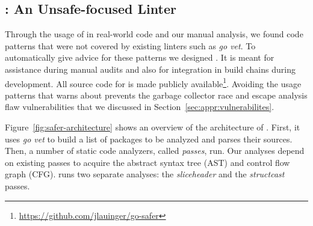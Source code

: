 \subsection{\toolSA{}: An Unsafe-focused Linter}

Through the usage of \toolUsage{} in real-world code and our manual analysis, we found \unsafe{} code patterns that were not covered by existing linters such as \textit{go vet}. 
To automatically give advice for these patterns we designed \toolSA{}.
It is meant for assistance during manual audits and also for integration in build chains during development.
All source code for \toolSA{} is made publicly available\footnote{\url{https://github.com/jlauinger/go-safer}}.
Avoiding the \unsafe{} usage patterns that \toolSA{} warns about prevents the garbage collector race and escape analysis flaw vulnerabilities that we discussed in Section~\ref{sec:appr:vulnerabilites}.




Figure~\ref{fig:safer-architecture} shows an overview of the architecture of \toolSA{}.
First, it uses \textit{go vet} to build a list of packages to be analyzed and parses their sources.
Then, a number of static code analyzers, called \textit{passes}, run.
Our analyses depend on existing passes to acquire the abstract syntax tree (AST) and control flow graph (CFG).
\toolSA{} runs two separate analyses: the \textit{sliceheader} and the \textit{structcast} passes. %


